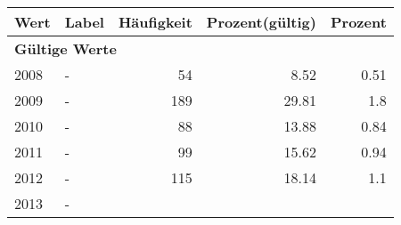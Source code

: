      \begin{longtable}{lXrrr}
     \toprule
     \textbf{Wert} & \textbf{Label} & \textbf{Häufigkeit} & \textbf{Prozent(gültig)} & \textbf{Prozent} \\
     \endhead
     \midrule
     \multicolumn{5}{l}{\textbf{Gültige Werte}}\\

     2008 &
     \multicolumn{1}{X}{ -  } &


       \num{54} &
       \num[round-mode=places,round-precision=2]{8,52} &
         \num[round-mode=places,round-precision=2]{0,51} \\

     2009 &
     \multicolumn{1}{X}{ -  } &


       \num{189} &
       \num[round-mode=places,round-precision=2]{29,81} &
         \num[round-mode=places,round-precision=2]{1,8} \\

     2010 &
     \multicolumn{1}{X}{ -  } &


       \num{88} &
       \num[round-mode=places,round-precision=2]{13,88} &
         \num[round-mode=places,round-precision=2]{0,84} \\

     2011 &
     \multicolumn{1}{X}{ -  } &


       \num{99} &
       \num[round-mode=places,round-precision=2]{15,62} &
         \num[round-mode=places,round-precision=2]{0,94} \\

     2012 &
     \multicolumn{1}{X}{ -  } &


       \num{115} &
       \num[round-mode=places,round-precision=2]{18,14} &
         \num[round-mode=places,round-precision=2]{1,1} \\

     2013 &
     \multicolumn{1}{X}{ -  } &



\end{longtable}
